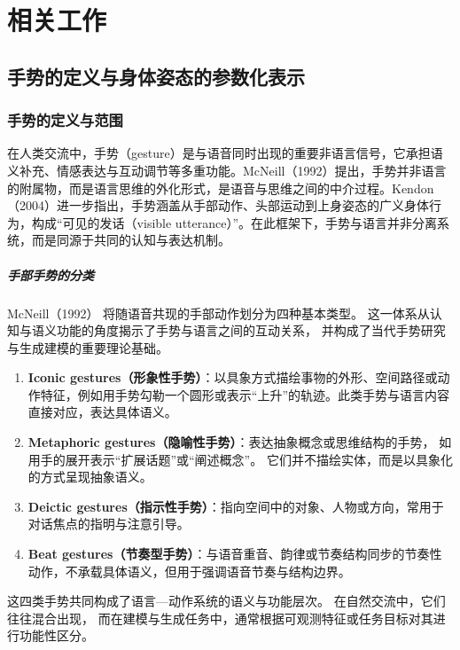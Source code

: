 
\chapter{相关工作}

\section{手势的定义与身体姿态的参数化表示}

\subsection{手势的定义与范围}

在人类交流中，手势（gesture）是与语音同时出现的重要非语言信号，它承担语义补充、情感表达与互动调节等多重功能。McNeill（1992）\cite{mcneill_1992_hand}提出，手势并非语言的附属物，而是语言思维的外化形式，是语音与思维之间的中介过程。Kendon（2004）\cite{kendon_2004_gesture}进一步指出，手势涵盖从手部动作、头部运动到上身姿态的广义身体行为，构成“可见的发话（visible utterance）”。在此框架下，手势与语言并非分离系统，而是同源于共同的认知与表达机制。

\paragraph{手部手势的分类}
McNeill（1992）\cite{mcneill_1992_hand} 将随语音共现的手部动作划分为四种基本类型。%
这一体系从认知与语义功能的角度揭示了手势与语言之间的互动关系，%
并构成了当代手势研究与生成建模的重要理论基础。

\begin{enumerate}
  \item \textbf{Iconic gestures（形象性手势）}：以具象方式描绘事物的外形、空间路径或动作特征，例如用手势勾勒一个圆形或表示“上升”的轨迹。此类手势与语言内容直接对应，表达具体语义。
  \item \textbf{Metaphoric gestures（隐喻性手势）}：表达抽象概念或思维结构的手势，%
如用手的展开表示“扩展话题”或“阐述概念”。%
它们并不描绘实体，而是以具象化的方式呈现抽象语义。
  \item \textbf{Deictic gestures（指示性手势）}：指向空间中的对象、人物或方向，常用于对话焦点的指明与注意引导。
  \item \textbf{Beat gestures（节奏型手势）}：与语音重音、韵律或节奏结构同步的节奏性动作，不承载具体语义，但用于强调语音节奏与结构边界。
\end{enumerate}

这四类手势共同构成了语言—动作系统的语义与功能层次。%
在自然交流中，它们往往混合出现，%
而在建模与生成任务中，通常根据可观测特征或任务目标对其进行功能性区分。%

